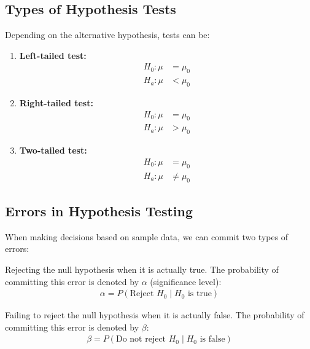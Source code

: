 \subsection{Types of Hypothesis Tests}

Depending on the alternative hypothesis, tests can be:

\begin{enumerate}
	\item \textbf{Left-tailed test:}
	\begin{align}
		H_0: \mu &= \mu_0 \\
		H_a: \mu &< \mu_0
	\end{align}
	
	\item \textbf{Right-tailed test:}
	\begin{align}
		H_0: \mu &= \mu_0 \\
		H_a: \mu &> \mu_0
	\end{align}
	
	\item \textbf{Two-tailed test:}
	\begin{align}
		H_0: \mu &= \mu_0 \\
		H_a: \mu &\neq \mu_0
	\end{align}
\end{enumerate}

\subsection{Errors in Hypothesis Testing}

When making decisions based on sample data, we can commit two types of errors:

\begin{definicion}
	Rejecting the null hypothesis when it is actually true. The probability of committing this error is denoted by $\alpha$ (significance level):
	\begin{align}
		\alpha = P(\text{Reject } H_0 \mid H_0 \text{ is true})
	\end{align}
\end{definicion}

\begin{definicion}
	Failing to reject the null hypothesis when it is actually false. The probability of committing this error is denoted by $\beta$:
	\begin{align}
		\beta = P(\text{Do not reject } H_0 \mid H_0 \text{ is false})
	\end{align}
\end{definicion}

